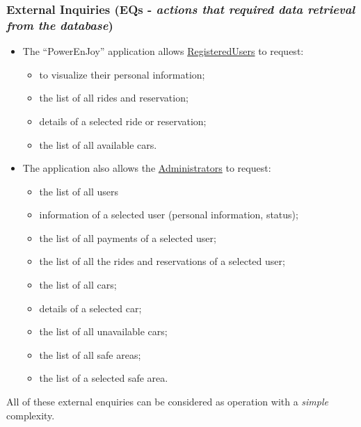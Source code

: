 \subsubsection{External Inquiries (EQs - \textit{actions that required data retrieval from the database})}
\begin{itemize}
	\item The ``PowerEnJoy'' application allows \underline{RegisteredUsers} to request:
		\begin{itemize}
			\item to visualize their personal information;
			\item the list of all rides and reservation; 
			\item details of a selected ride or reservation;
			\item the list of all available cars.
		\end{itemize}
	\item The application also allows the \underline{Administrators} to request:
		\begin{itemize}
			\item the list of all users
			\item information of a selected user (personal information, status);
			\item the list of all payments of a selected user;
			\item the list of all the rides and reservations of a selected user;
			\item the list of all cars;
			\item details of a selected car;
			\item the list of all unavailable cars;
			\item the list of all safe areas;
			\item the list of a selected safe area.
		\end{itemize}
\end{itemize}

All of these external enquiries can be considered as operation with a \textit{simple} complexity. 

